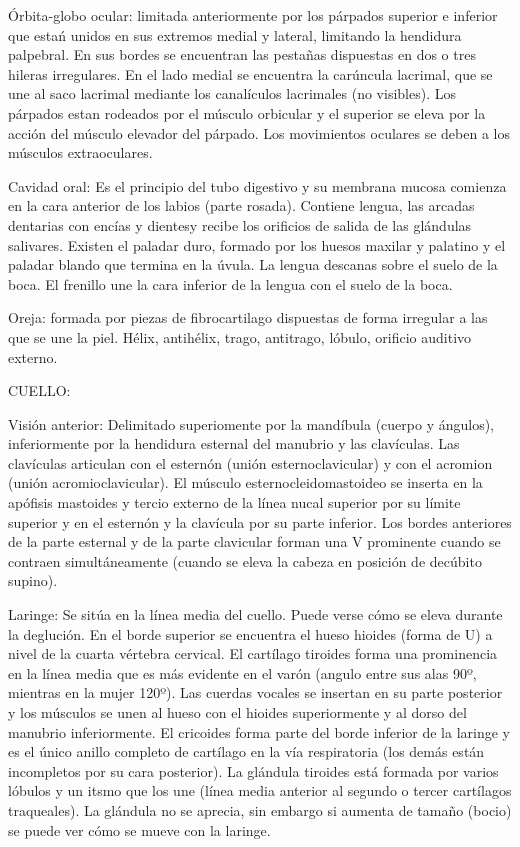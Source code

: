 Órbita-globo ocular: limitada anteriormente por los párpados superior e inferior que estań unidos en sus extremos medial y lateral, limitando la hendidura palpebral. En sus bordes se encuentran las pestañas dispuestas en dos o tres hileras irregulares. En el lado medial se encuentra la carúncula lacrimal, que se une al saco lacrimal mediante los canalículos lacrimales (no visibles). Los párpados estan rodeados por el músculo orbicular y el superior se eleva por la acción del músculo elevador del párpado. Los movimientos oculares se deben a los músculos extraoculares.

Cavidad oral: Es el principio del tubo digestivo y su membrana mucosa comienza en la cara anterior de los labios (parte rosada). Contiene lengua, las arcadas dentarias con encías y dientesy recibe los orificios de salida de las glándulas salivares. Existen el paladar duro, formado por los huesos maxilar y palatino y el paladar blando que termina en la úvula. La lengua descanas sobre el suelo de la boca. El frenillo une la cara inferior de la lengua con el suelo de la boca.

Oreja: formada por piezas de fibrocartilago dispuestas de forma irregular a las que se une la piel. Hélix, antihélix, trago, antitrago, lóbulo, orificio auditivo externo.


CUELLO:

Visión anterior: Delimitado superiomente por la mandíbula (cuerpo y ángulos), inferiormente por la hendidura esternal del manubrio y las clavículas. Las clavículas articulan con el esternón (unión esternoclavicular) y con el acromion (unión acromioclavicular).
El músculo esternocleidomastoideo se inserta en la apófisis mastoides y tercio externo de la línea nucal superior por su límite superior y en el esternón y la clavícula por su parte inferior. Los bordes anteriores de la parte esternal y de la parte clavicular forman una V prominente cuando se contraen simultáneamente (cuando se eleva la cabeza en posición de decúbito supino).

Laringe: Se sitúa en la línea media del cuello. Puede verse cómo se eleva durante la deglución. En el borde superior se encuentra el hueso hioides (forma de U) a nivel de la cuarta vértebra cervical. El cartílago tiroides forma una prominencia en la línea media que es más evidente en el varón (angulo entre sus alas 90º, mientras en la mujer 120º). Las cuerdas vocales se insertan en su parte posterior y los músculos se unen al hueso con el hioides superiormente y al dorso del manubrio inferiormente. El cricoides forma parte del borde inferior de la laringe y es el único anillo completo de cartílago en la vía respiratoria (los demás están incompletos por su cara posterior). La glándula tiroides está formada por varios lóbulos y un itsmo que los une (línea media anterior al segundo o tercer cartílagos traqueales). La glándula no se aprecia, sin embargo si aumenta de tamaño (bocio) se puede ver cómo se mueve con la laringe. 


